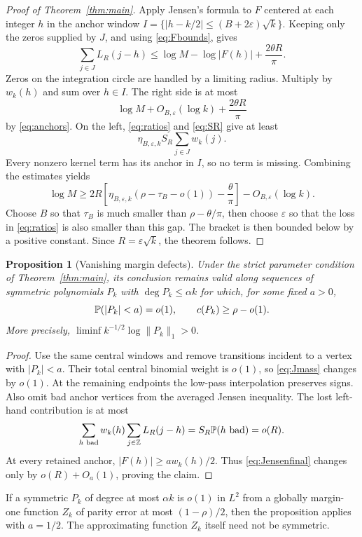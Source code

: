 \documentclass[11pt]{article}
\newtheorem{proposition}[theorem]{Proposition}
\theoremstyle{remark}\newtheorem{remark}[theorem]{Remark}
\begin{document}
\begin{proof}[Proof of Theorem~\ref{thm:main}]
Apply Jensen's formula to $F$ centered at each integer $h$ in the
anchor window $I=\{|h-k/2|\le(B+2\varepsilon)\sqrt{k}\}$. Keeping only
the zeros supplied by $J$, and using \eqref{eq:Fbounds}, gives
\[
 \sum_{j\in J}L_R(j-h)
 \le \log M-\log|F(h)|+\frac{2\theta R}{\pi}.
\]
Zeros on the integration circle are handled by a limiting radius.
Multiply by $w_k(h)$ and sum over $h\in I$. The right side is at most
\[
 \log M+O_{B,\varepsilon}(\log k)+\frac{2\theta R}{\pi}
\]
by \eqref{eq:anchors}. On the left, \eqref{eq:ratios} and
\eqref{eq:SR} give at least
\[
 \eta_{B,\varepsilon,k}S_R\sum_{j\in J}w_k(j).
\]
Every nonzero kernel term has its anchor in $I$, so no term is missing.
Combining the estimates yields
\begin{equation}\label{eq:Jensenfinal}
 \log M\ge
 2R\left[\eta_{B,\varepsilon,k}(\rho-\tau_B-o(1))
                 -\frac\theta\pi\right]-O_{B,\varepsilon}(\log k).
\end{equation}
Choose $B$ so that $\tau_B$ is much smaller than $\rho-\theta/\pi$,
then choose $\varepsilon$ so that the loss in \eqref{eq:ratios} is also
smaller than this gap. The bracket is then bounded below by a positive
constant. Since $R=\varepsilon\sqrt{k}$, the theorem follows.
\end{proof}

\begin{proposition}[Vanishing margin defects]\label{prop:stable}
Under the strict parameter condition of Theorem~\ref{thm:main}, its
conclusion remains valid along sequences of symmetric polynomials $P_k$
with $\deg P_k\le\alpha k$ for which, for some fixed $a>0$,
\[
 \mathbb P(|P_k|<a)=o(1),\qquad c(P_k)\ge\rho-o(1).
\]
More precisely, $\liminf k^{-1/2}\log\|P_k\|_1>0$.
\end{proposition}
\begin{proof}
Use the same central windows and remove transitions incident to a
vertex with $|P_k|<a$. Their total central binomial weight is $o(1)$,
so \eqref{eq:Jmass} changes by $o(1)$. At the remaining endpoints the
low-pass interpolation preserves signs. Also omit bad anchor vertices
from the averaged Jensen inequality. The lost left-hand contribution
is at most
\[
 \sum_{h\text{ bad}}w_k(h)\sum_{j\in\mathbb Z}L_R(j-h)
 =S_R\mathbb P(h\text{ bad})=o(R).
\]
At every retained anchor, $|F(h)|\ge a w_k(h)/2$. Thus
\eqref{eq:Jensenfinal} changes only by $o(R)+O_a(1)$, proving the claim.
\end{proof}
If a symmetric $P_k$ of degree at most $\alpha k$ is $o(1)$ in $L^2$ from a globally margin-one
function $Z_k$ of parity error at most $(1-\rho)/2$, then the proposition
applies with $a=1/2$. The approximating function $Z_k$ itself need not
be symmetric.
\end{document}
